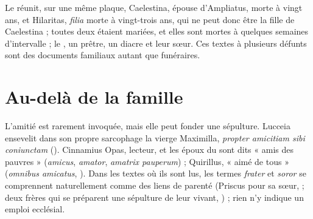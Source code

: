 Le  réunit, sur une même plaque, Caelestina, épouse d’Ampliatus, morte à vingt ans, et Hilaritas, \emph{filia} morte à vingt-trois ans, qui ne peut donc être la fille de Caelestina ; toutes deux étaient mariées, et elles sont mortes à quelques semaines d’intervalle ; le , un prêtre, un diacre et leur sœur. Ces textes à plusieurs défunts sont des documents familiaux autant que funéraires.

\section{Au-delà de la famille}

L’amitié est rarement invoquée, mais elle peut fonder une sépulture. Lucceia ensevelit dans son propre sarcophage la vierge Maximilla, \emph{propter amicitiam sibi coniunctam} (). Cinnamius Opas, lecteur, et les époux du  sont dits « amis des pauvres » (\emph{amicus}, \emph{amator}, \emph{amatrix pauperum}) ; Quirillus, « aimé de tous » (\emph{omnibus amicatus}, ). Dans les textes où ils sont lus, les termes \emph{frater} et \emph{soror} se comprennent naturellement comme des liens de parenté (Priscus pour sa sœur,  ; deux frères qui se préparent une sépulture de leur vivant, ) ; rien n’y indique un emploi ecclésial.


